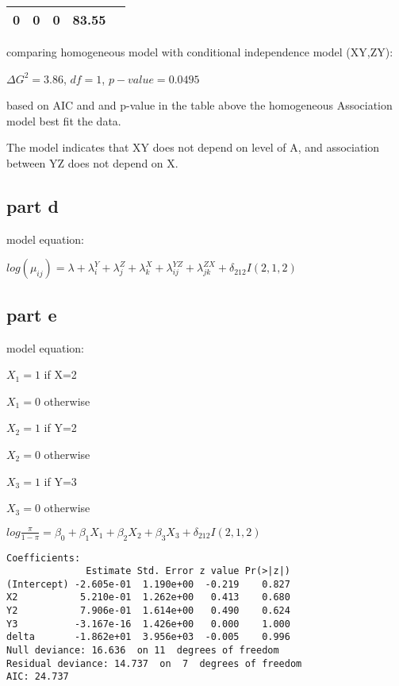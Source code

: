 \documentclass[]{article}
\begin{document}
\begin{longtable}[c]{@{}ccccc@{}}
\begin{minipage}[t]{0.07\columnwidth}\centering\strut
0
\strut\end{minipage} &
\begin{minipage}[t]{0.06\columnwidth}\centering\strut
0
\strut\end{minipage} &
\begin{minipage}[t]{0.12\columnwidth}\centering\strut
0
\strut\end{minipage} &
\begin{minipage}[t]{0.06\columnwidth}\centering\strut
83.55
\strut\end{minipage}\tabularnewline
\bottomrule
\end{longtable}

comparing homogeneous model with conditional independence model (XY,ZY):

\(\Delta G^2 = 3.86\), \(df=1\), \(p-value=0.0495\)

based on AIC and and p-value in the table above the homogeneous
Association model best fit the data.

The model indicates that XY does not depend on level of A, and
association between YZ does not depend on X.

\subsection{part d}\label{part-d-2}

model equation:

\(log(\mu_{ij}) = \lambda + \lambda_i^Y + \lambda_j^Z + \lambda_k^X + \lambda_{ij}^{YZ} + \lambda_{jk}^{ZX} + \delta_{212}I(2,1,2)\)

\subsection{part e}\label{part-e-1}

model equation:

\(X_1 = 1\) if X=2

\(X_1 = 0\) otherwise

\(X_2 = 1\) if Y=2

\(X_2 = 0\) otherwise

\(X_3 = 1\) if Y=3

\(X_3 = 0\) otherwise

\(log \frac{\pi}{1-\pi} = \beta_0 + \beta_1 X_1 + \beta_2 X_2 + \beta_3 X_3 + \delta_{212}I(2,1,2)\)

\begin{verbatim}
Coefficients:
              Estimate Std. Error z value Pr(>|z|)
(Intercept) -2.605e-01  1.190e+00  -0.219    0.827
X2           5.210e-01  1.262e+00   0.413    0.680
Y2           7.906e-01  1.614e+00   0.490    0.624
Y3          -3.167e-16  1.426e+00   0.000    1.000
delta       -1.862e+01  3.956e+03  -0.005    0.996
Null deviance: 16.636  on 11  degrees of freedom
Residual deviance: 14.737  on  7  degrees of freedom
AIC: 24.737
\end{verbatim}
\end{document}
